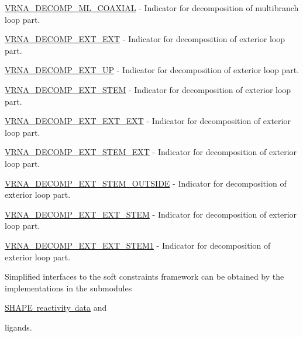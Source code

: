 \begin{DoxyItemize}
\item \mbox{\hyperlink{group__constraints_ga4fe48d575830b16c208e280e01ab1497}{V\+R\+N\+A\+\_\+\+D\+E\+C\+O\+M\+P\+\_\+\+M\+L\+\_\+\+C\+O\+A\+X\+I\+AL}} -\/ Indicator for decomposition of multibranch loop part.
\item \mbox{\hyperlink{group__constraints_ga437adf5115c1999304eff26b41e4c9b6}{V\+R\+N\+A\+\_\+\+D\+E\+C\+O\+M\+P\+\_\+\+E\+X\+T\+\_\+\+E\+XT}} -\/ Indicator for decomposition of exterior loop part.
\item \mbox{\hyperlink{group__constraints_gaff1ddaffe86d984623910b40cc8a8717}{V\+R\+N\+A\+\_\+\+D\+E\+C\+O\+M\+P\+\_\+\+E\+X\+T\+\_\+\+UP}} -\/ Indicator for decomposition of exterior loop part.
\item \mbox{\hyperlink{group__constraints_gae44b5ace0d9b4a29088069ecb4cec441}{V\+R\+N\+A\+\_\+\+D\+E\+C\+O\+M\+P\+\_\+\+E\+X\+T\+\_\+\+S\+T\+EM}} -\/ Indicator for decomposition of exterior loop part.
\item \mbox{\hyperlink{group__constraints_ga803bd818b3f4b2b0a4a5cfa2f7dc2045}{V\+R\+N\+A\+\_\+\+D\+E\+C\+O\+M\+P\+\_\+\+E\+X\+T\+\_\+\+E\+X\+T\+\_\+\+E\+XT}} -\/ Indicator for decomposition of exterior loop part.
\item \mbox{\hyperlink{group__constraints_gabb09c5b78b75a44502fc77b950125c1e}{V\+R\+N\+A\+\_\+\+D\+E\+C\+O\+M\+P\+\_\+\+E\+X\+T\+\_\+\+S\+T\+E\+M\+\_\+\+E\+XT}} -\/ Indicator for decomposition of exterior loop part.
\item \mbox{\hyperlink{group__constraints_gae7554cd3ff089360c02e4920229e221c}{V\+R\+N\+A\+\_\+\+D\+E\+C\+O\+M\+P\+\_\+\+E\+X\+T\+\_\+\+S\+T\+E\+M\+\_\+\+O\+U\+T\+S\+I\+DE}} -\/ Indicator for decomposition of exterior loop part.
\item \mbox{\hyperlink{group__constraints_ga06efd054c9271438f6d82d4559d9e69f}{V\+R\+N\+A\+\_\+\+D\+E\+C\+O\+M\+P\+\_\+\+E\+X\+T\+\_\+\+E\+X\+T\+\_\+\+S\+T\+EM}} -\/ Indicator for decomposition of exterior loop part.
\item \mbox{\hyperlink{group__constraints_ga2e75d7a77118735b32f25422d9686719}{V\+R\+N\+A\+\_\+\+D\+E\+C\+O\+M\+P\+\_\+\+E\+X\+T\+\_\+\+E\+X\+T\+\_\+\+S\+T\+E\+M1}} -\/ Indicator for decomposition of exterior loop part.
\end{DoxyItemize}

Simplified interfaces to the soft constraints framework can be obtained by the implementations in the submodules


\begin{DoxyItemize}
\item \mbox{\hyperlink{group___s_h_a_p_e__reactivities}{S\+H\+A\+PE reactivity data}} and
\item ligands.
\end{DoxyItemize}

